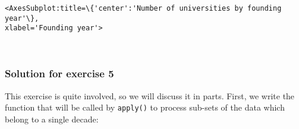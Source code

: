 \documentclass{scrartcl}
\makeatletter
\newcommand{\boxspacing}{\kern\kvtcb@left@rule\kern\kvtcb@boxsep}
\newcommand{\prompt}[4]{
        {\ttfamily\llap{{\color{#2}[#3]:\hspace{3pt}#4}}\vspace{-\baselineskip}}
    }
\makeatother
\begin{document}
            \begin{tcolorbox}[breakable, size=fbox, boxrule=.5pt, pad at break*=1mm, opacityfill=0]
\prompt{Out}{outcolor}{49}{\boxspacing}
\begin{Verbatim}[commandchars=\\\{\}]
<AxesSubplot:title=\{'center':'Number of universities by founding year'\},
xlabel='Founding year'>
\end{Verbatim}
\end{tcolorbox}
        
    \begin{center}
    \end{center}
    { \hspace*{\fill} \\}
    
    \hypertarget{solution-for-exercise-5}{%
\subsubsection{Solution for exercise 5}\label{solution-for-exercise-5}}

This exercise is quite involved, so we will discuss it in parts. First,
we write the function that will be called by \texttt{apply()} to process
sub-sets of the data which belong to a single decade:
\end{document}
